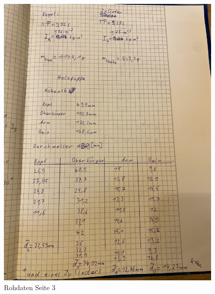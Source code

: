 \begin{figure}
  \centering
  \includegraphics[width=\textwidth, angle=270]{Bilder/Data3.jpg}
  \caption{Rohdaten Seite 3}
  \label{fig:Data3}
\end{figure}
